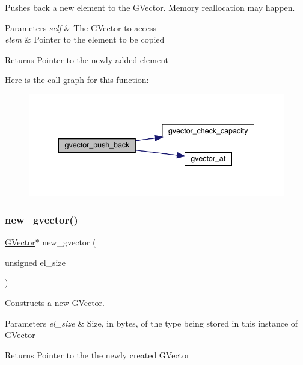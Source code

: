 Pushes back a new element to the G\+Vector. Memory reallocation may happen. 


\begin{DoxyParams}{Parameters}
{\em self} & The G\+Vector to access \\
\hline
{\em elem} & Pointer to the element to be copied\\
\hline
\end{DoxyParams}
\begin{DoxyReturn}{Returns}
Pointer to the newly added element 
\end{DoxyReturn}
Here is the call graph for this function\+:\nopagebreak
\begin{figure}[H]
\begin{center}
\leavevmode
\includegraphics[width=341pt]{group___g_vector_ga638f666cc999e6b840302ca1de552b85_cgraph}
\end{center}
\end{figure}
\hypertarget{group___g_vector_gae4381c0ccdbebaa240e06595e59c5712}{}\label{group___g_vector_gae4381c0ccdbebaa240e06595e59c5712} 
\subsubsection{\texorpdfstring{new\+\_\+gvector()}{new\_gvector()}}
{\footnotesize\ttfamily \hyperlink{group___g_vector_ga6d90d5e6b721779a43354f2752b79281}{G\+Vector}$\ast$ new\+\_\+gvector (\begin{DoxyParamCaption}\item[{unsigned}]{el\+\_\+size }\end{DoxyParamCaption})}



Constructs a new G\+Vector. 


\begin{DoxyParams}{Parameters}
{\em el\+\_\+size} & Size, in bytes, of the type being stored in this instance of G\+Vector\\
\hline
\end{DoxyParams}
\begin{DoxyReturn}{Returns}
Pointer to the the newly created G\+Vector 
\end{DoxyReturn}
